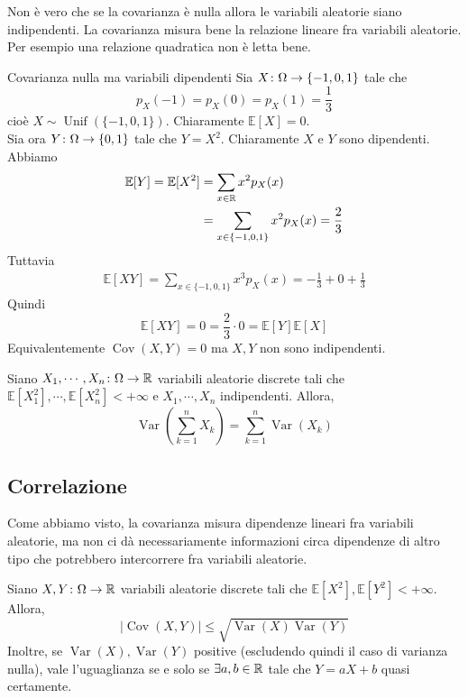 \documentclass[a4paper]{article}
\begin{document}
Non è vero che se la covarianza è nulla allora le variabili aleatorie siano indipendenti.
La covarianza misura bene la relazione lineare fra variabili
aleatorie. Per esempio una relazione quadratica non è letta bene.

\begin{snippetexample}{Covarianza nulla ma variabili dipendenti}
    Sia \(X \colon \Omega \to \{-1, 0, 1\}\)
    tale che
    \[
        p_X(-1) = p_X(0) = p_X(1) = \frac13
    \]
    cioè \(X \sim \operatorname{Unif}(\{-1, 0, 1\})\).
    Chiaramente \(\mathbb E[X] = 0\). \\
    Sia ora \(Y \colon \Omega \to \{0,1\}\) tale che \(Y = X^2\).
    Chiaramente \(X\) e \(Y\) sono dipendenti. Abbiamo
    \begin{align*}
        \mathbb E[Y] = \mathbb E[X^2] &= \sum_{x\in\mathbb{R}}x^2 p_X(x) \\
        &= \sum_{x\in \{-1, 0, 1\}} x^2 p_X(x) = \frac23
    \end{align*}
    Tuttavia
    \begin{align*}
        \mathbb E[XY] = \sum_{x\in \{-1, 0, 1\}} x^3 p_X(x)
        = -\frac13 + 0 + \frac13
    \end{align*}
    Quindi \[
        \mathbb E[XY] = 0 = \frac23 \cdot 0 = \mathbb E[Y]\mathbb E[X]
    \]
    Equivalentemente \(\operatorname{Cov}(X,Y) = 0\)
    ma \(X,Y\) non sono indipendenti.
\end{snippetexample}

\begin{snippetcorollary}{}
    Siano \(X_1, \cdots, X_n \colon \Omega \to \mathbb{R}\)
    variabili aleatorie discrete
    tali che \(\mathbb E[X_1^2], \cdots, \mathbb E[X_n^2] < +\infty\)
    e \(X_1, \cdots, X_n\) indipendenti. Allora,
    \[
        \operatorname{Var}\left(
            \sum_{k=1}^n X_k
        \right)
        = \sum_{k=1}^n \operatorname{Var}(X_k)
    \]
\end{snippetcorollary}

\subsection{Correlazione}

Come abbiamo visto, la covarianza misura
dipendenze lineari fra variabili aleatorie, ma
non ci dà necessariamente informazioni circa dipendenze di altro tipo che potrebbero intercorrere
fra variabili aleatorie.

\begin{snippetproposition}{}
    Siano \(X,Y \colon \Omega \to \mathbb{R}\) variabili aleatorie discrete
    tali che \(\mathbb E[X^2], \mathbb E[Y^2] < +\infty\).
    Allora,
    \[
        |\operatorname{Cov}(X,Y)|
        \leq \sqrt{\operatorname{Var}(X) \operatorname{Var}(Y)}
    \]
    Inoltre, se \(\operatorname{Var}(X),\operatorname{Var}(Y)\)
    positive (escludendo quindi il caso di varianza nulla),
    vale l'uguaglianza se e solo se \(\exists a,b \in \mathbb{R}\)
    tale che \(Y = aX + b\) quasi certamente.
\end{snippetproposition}
\end{document}
